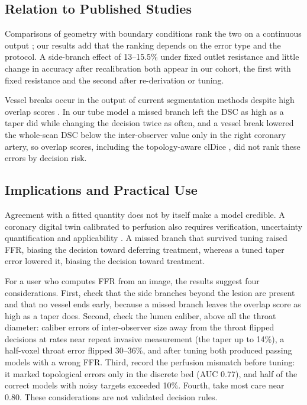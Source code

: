 \documentclass[journal,twoside,web]{ieeecolor}
\begin{document}
\subsection{Relation to Published Studies}
Comparisons of geometry with boundary conditions rank the two on a continuous output \cite{sankaran2016,tanade2022,korte2023};
our results add that the ranking depends on the error type and the protocol. A side-branch effect of 13--15.5\% under
fixed outlet resistance \cite{gamage2022} and little change in accuracy after recalibration \cite{gosling2020} both
appear in our cohort, the first with fixed resistance and the second after re-derivation or tuning.

Vessel breaks occur in the output of current segmentation methods despite high overlap scores \cite{bransby2026}.
In our tube model a missed branch left the DSC as high as a taper did while changing the decision twice as often,
and a vessel break lowered the whole-scan DSC below the inter-observer value only in the right coronary artery, so
overlap scores, including the topology-aware clDice \cite{shit2021}, did not rank these errors by decision risk.

\subsection{Implications and Practical Use}
Agreement with a fitted quantity does not by itself make a model credible. A coronary digital twin calibrated to perfusion also requires verification,
uncertainty quantification and applicability \cite{viceconti2025}. A missed branch that survived tuning raised FFR, biasing the decision toward
deferring treatment, whereas a tuned taper error lowered it, biasing the decision toward treatment.

For a user who computes FFR from an image, the results suggest four considerations. First, check that the side branches
beyond the lesion are present and that no vessel ends early, because a missed branch leaves the overlap score as high as a taper does.
Second, check the lumen caliber, above all the throat diameter: caliber errors of
inter-observer size away from the throat flipped decisions at rates near repeat invasive measurement (the taper up to 14\%), a half-voxel throat error flipped 30--36\%, and after
tuning both produced passing models with a wrong FFR. Third, record the perfusion mismatch before tuning: it marked topological errors only in the discrete bed (AUC 0.77), and half of the correct models with noisy targets exceeded 10\%. Fourth, take most care near 0.80. These considerations are not validated decision rules.
\end{document}
